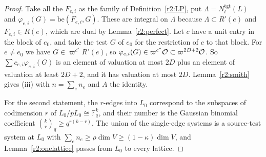 \begin{proof}
Take all the $F_{e,i}$ as the family of Definition~\ref{r2:LP}, put $\Lambda=N^{\mathrm{tgt}}_t(L)$ and $\varphi_{e,i}(G)=\mathrm{be}(F_{e,i},G)$. These are integral on $\Lambda$ because $\Lambda\subset R'(e)$ and $F_{e,i}\in R(e)$, which are dual by Lemma~\ref{r2:perfect}. Let $c$ have a unit entry in the block of $e_0$, and take the test $G$ of $e_0$ for the restriction of $c$ to that block. For $e\ne e_0$ we have $G\in\varpi^{c^*}R'(e)$, so $\varphi_{e,i}(G)\in\varpi^{c^*}\mathcal O\subset\varpi^{2D+2}\mathcal O$. So $\sum c_{e,i}\varphi_{e,i}(G)$ is an element of valuation at most $2D$ plus an element of valuation at least $2D+2$, and it has valuation at most $2D$. Lemma~\ref{r2:smith} gives (iii) with $n=\sum_en_e$ and $A$ the identity.

For the second statement, the $r$-edges into $L_0$ correspond to the subspaces of codimension $r$ of $L_0/pL_0\cong\mathbb F_q^k$, and their number is the Gaussian binomial coefficient $\binom kr_q\ge q^{r(k-r)}$. The union of the single-edge systems is a source-test system at $L_0$ with $\sum_en_e\ge\rho\dim V\ge(1-\kappa)\dim V$, and Lemma~\ref{r2:onelattice} passes from $L_0$ to every lattice.
\end{proof}

